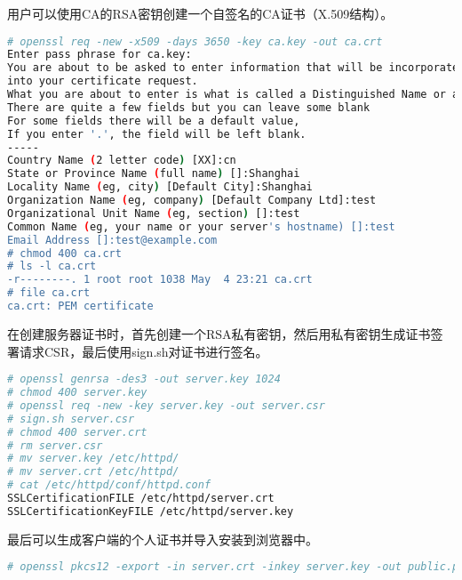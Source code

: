 用户可以使用CA的RSA密钥创建一个自签名的CA证书（X.509结构）。



\begin{lstlisting}[language=bash]
# openssl req -new -x509 -days 3650 -key ca.key -out ca.crt
Enter pass phrase for ca.key:
You are about to be asked to enter information that will be incorporated
into your certificate request.
What you are about to enter is what is called a Distinguished Name or a DN.
There are quite a few fields but you can leave some blank
For some fields there will be a default value,
If you enter '.', the field will be left blank.
-----
Country Name (2 letter code) [XX]:cn  
State or Province Name (full name) []:Shanghai
Locality Name (eg, city) [Default City]:Shanghai
Organization Name (eg, company) [Default Company Ltd]:test
Organizational Unit Name (eg, section) []:test
Common Name (eg, your name or your server's hostname) []:test
Email Address []:test@example.com
# chmod 400 ca.crt
# ls -l ca.crt
-r--------. 1 root root 1038 May  4 23:21 ca.crt
# file ca.crt
ca.crt: PEM certificate
\end{lstlisting}


在创建服务器证书时，首先创建一个RSA私有密钥，然后用私有密钥生成证书签署请求CSR，最后使用sign.sh对证书进行签名。


\begin{lstlisting}[language=bash]
# openssl genrsa -des3 -out server.key 1024
# chmod 400 server.key
# openssl req -new -key server.key -out server.csr
# sign.sh server.csr
# chmod 400 server.crt
# rm server.csr
# mv server.key /etc/httpd/
# mv server.crt /etc/httpd/
# cat /etc/httpd/conf/httpd.conf
SSLCertificationFILE /etc/httpd/server.crt
SSLCertificationKeyFILE /etc/httpd/server.key
\end{lstlisting}


最后可以生成客户端的个人证书并导入安装到浏览器中。




\begin{lstlisting}[language=bash]
# openssl pkcs12 -export -in server.crt -inkey server.key -out public.p12 -name "public"
\end{lstlisting}





\begin{lstlisting}[language=bash]

\end{lstlisting}





